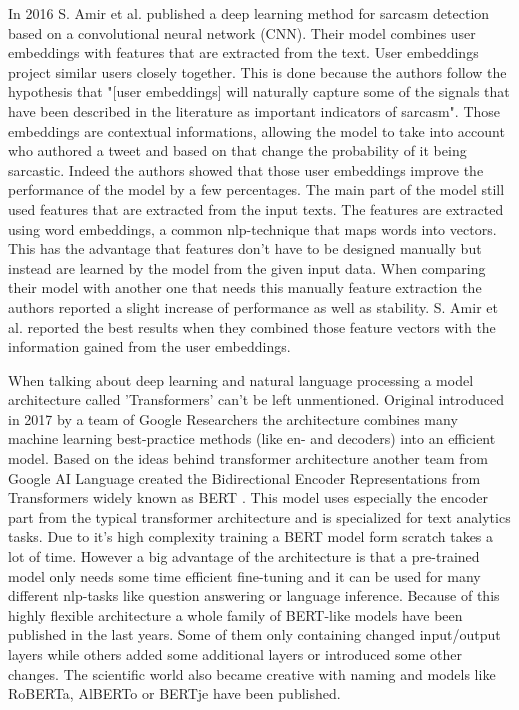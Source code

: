 \documentclass[sigconf,  review=false, nonacm=true]{acmart}
\begin{document}
In 2016 S. Amir et al. \cite{Modelling-Context-with-User-Embeddings-for-Sarcasm-Detection-in-Social-Media} published a deep learning method for sarcasm detection based on a convolutional neural network (CNN). Their model combines user embeddings with features that are extracted from the text. User embeddings project similar users closely together. This is done because the authors follow the hypothesis that "[user embeddings] will naturally capture some of the signals that have been described in the literature as important indicators of sarcasm". Those embeddings are contextual informations, allowing the model to take into account who authored a tweet and based on that change the probability of it being sarcastic. Indeed the authors showed that those user embeddings improve the performance of the model by a few percentages. 
The main part of the model still used features that are extracted from the input texts. The features are extracted using word embeddings, a common nlp-technique that maps words into vectors. This has the advantage that features don't have to be designed manually but instead are learned by the model from the given input data. When comparing their model with another one that needs this manually feature extraction the authors reported a slight increase of performance as well as stability. S. Amir et al. reported the best results when they combined those feature vectors with the information gained from the user embeddings.

When talking about deep learning and natural language processing a model architecture called 'Transformers' can't be left unmentioned. Original introduced in 2017 by a team of Google Researchers \cite{transformers} the architecture combines many machine learning best-practice methods (like en- and decoders) into an efficient model. Based on the ideas behind transformer architecture another team from Google AI Language created the Bidirectional Encoder Representations from Transformers widely known as BERT \cite{BERT}. This model uses especially the encoder part from the typical transformer architecture and is specialized for text analytics tasks. Due to it's high complexity training a BERT model form scratch takes a lot of time. However a big advantage of the architecture is that a pre-trained model only needs some time efficient fine-tuning and it can be used for many different nlp-tasks like question answering or language inference. Because of this highly flexible architecture a whole family of BERT-like models have been published in the last years. Some of them only containing changed input/output layers while others added some additional layers or introduced some other changes. The scientific world also became creative with naming and models like RoBERTa, AlBERTo or BERTje have been published.
\end{document}
